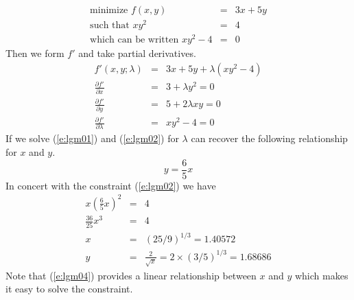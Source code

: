 \begin{eqnarray}
\textrm{minimize } f(x, y) &=& 3 x + 5 y \\
\textrm{such that } xy^2 &=& 4 \\
\textrm{which can be written } xy^2 - 4 &=& 0
\end{eqnarray}
Then we form $f'$ and take partial derivatives.
\begin{eqnarray}
f'(x,y;\lambda) &=& 3 x + 5 y + \lambda(xy^2 - 4) \\
\frac{\partial f'}{\partial x} &=& 3 + \lambda y^2 = 0 \label{e:lgm01}\\
\frac{\partial f'}{\partial y} &=& 5 + 2\lambda xy = 0 \label{e:lgm02}\\
\frac{\partial f'}{\partial \lambda} &=& xy^2 - 4 = 0 \label{e:lgm03}
\end{eqnarray}
If we solve (\ref{e:lgm01}) and (\ref{e:lgm02}) for $\lambda$ can recover the following relationship for $x$ and $y$.
\begin{equation}
y = \frac{6}{5}x \label{e:lgm04}
\end{equation}
In concert with the constraint (\ref{e:lgm02}) we have
\begin{eqnarray}
x\left(\frac{6}{5}x\right)^2 &=& 4 \\
\frac{36}{25}x^3 &=& 4 \\
x &=& (25/9)^{1/3} = 1.40572 \\
y &=& \frac{2}{\sqrt{x}} = 2 \times (3/5)^{1/3} = 1.68686
\end{eqnarray}
Note that (\ref{e:lgm04}) provides a linear relationship between $x$ and $y$ which makes it easy to solve the constraint.
